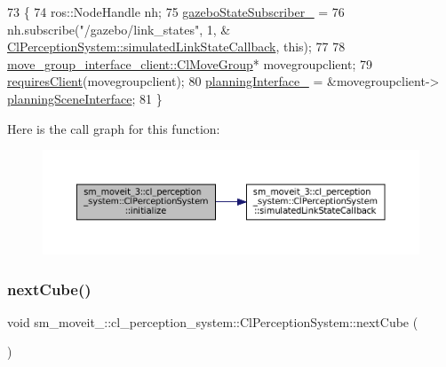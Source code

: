 \begin{DoxyCode}
73   \{
74     ros::NodeHandle nh;
75     \hyperlink{classsm__moveit__3_1_1cl__perception__system_1_1ClPerceptionSystem_a66371d7b71709d9286e63ee92f6507c5}{gazeboStateSubscriber\_} =
76         nh.subscribe(\textcolor{stringliteral}{"/gazebo/link\_states"}, 1, &
      \hyperlink{classsm__moveit__3_1_1cl__perception__system_1_1ClPerceptionSystem_a540c3a50c29e6ec58f6fcd7e993d9dff}{ClPerceptionSystem::simulatedLinkStateCallback}, \textcolor{keyword}{this});
77     
78     \hyperlink{classmove__group__interface__client_1_1ClMoveGroup}{move\_group\_interface\_client::ClMoveGroup}* movegroupclient;
79     \hyperlink{classsmacc_1_1ISmaccClient_a7a9990a2f3e35d547671188d69fee520}{requiresClient}(movegroupclient);
80     \hyperlink{classsm__moveit__3_1_1cl__perception__system_1_1ClPerceptionSystem_aa59191e3993ffbfc8e8332f76d727259}{planningInterface\_} = &movegroupclient->
      \hyperlink{classmove__group__interface__client_1_1ClMoveGroup_a401213ca52233581d2a659dbb772720c}{planningSceneInterface};
81   \}
\end{DoxyCode}
Here is the call graph for this function\+:
\nopagebreak
\begin{figure}[H]
\begin{center}
\leavevmode
\includegraphics[width=350pt]{classsm__moveit__3_1_1cl__perception__system_1_1ClPerceptionSystem_a852bf07fda7da87e7bb4ad9336e25042_cgraph}
\end{center}
\end{figure}
\mbox{\label{classsm__moveit__3_1_1cl__perception__system_1_1ClPerceptionSystem_a35d80131bec4a63ab939667865e7d08d}} 
\subsubsection{\texorpdfstring{next\+Cube()}{nextCube()}}
{\footnotesize\ttfamily void sm\+\_\+moveit\+\_\+::cl\+\_\+perception\+\_\+system\+::\+Cl\+Perception\+System\+::next\+Cube (\begin{DoxyParamCaption}{ }\end{DoxyParamCaption})\hspace{0.3cm}{\ttfamily [inline]}}



